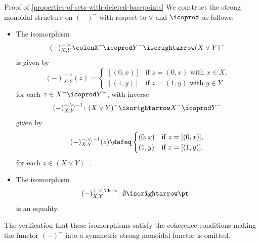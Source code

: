 \begin{Proof}{Proof of \cref{properties-of-sets-with-deleted-basepoints}}
    We construct the strong monoidal structure on $(-)^{-}$ with respect to $\vee$ and $\icoprod$ as follows:
    \begin{itemize}
        \item{}The isomorphism
            \[
                (-)^{-,\vee}_{X,Y}%
                \colon%
                X^{-}\icoprod Y^{-}%
                \isorightarrow
                (X\vee Y)^{-}
            \]%
            is given by
            \[
                (-)^{-,\vee}_{X,Y}(z)%
                =%
                \begin{cases}%
                    [(0,x)] &\text{if $z=(0,x)$ with $x\in X$,}\\ %
                    [(1,y)] &\text{if $z=(1,y)$ with $y\in Y$}%
                \end{cases}%
            \]%
            for each $z\in X^{-}\icoprod Y^{-}$, with inverse
            \[
                (-)^{-,\vee,-1}_{X,Y}
                \colon%
                (X\vee Y)^{-}
                \isorightarrow
                X^{-}\icoprod Y^{-}%
            \]%
            given by
            \[
                (-)^{-,\vee,-1}_{X,Y}(z)%
                \defeq%
                \begin{cases}
                    (0,x) &\text{if $z=[(0,x)]$,}\\
                    (1,y) &\text{if $z=[(1,y)]$,}
                \end{cases}
            \]%
            for each $z\in(X\vee Y)^{-}$.
        \item{}The isomorphism
            \[
                (-)^{+,\vee,\Unit}_{X,Y}%
                \colon%
                \emptyset%
                \isorightarrow
                \pt^{-}%
            \]%
            is an equality.
    \end{itemize}
    The verification that these isomorphisms satisfy the coherence conditions making the functor $(-)^{-}$ into a symmetric strong monoidal functor is omitted.


\end{Proof}

